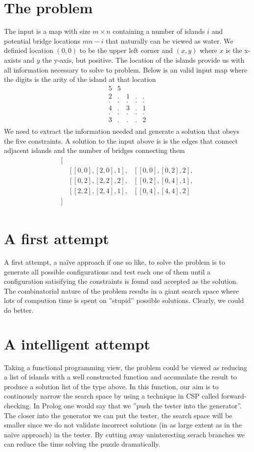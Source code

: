 \documentclass[a4paper,12pt]{article}
\begin{document}
\section*{The problem}
The input is a map with size $m \times n$ containing a number of islands $i$ and potential bridge locations $mn - i$ that naturally can be viewed as water. We definied location $(0,0)$ to be the upper left corner and $(x,y)$ where $x$ is the x-axists and $y$ the y-axis, but positive. The location of the islands provide us with all information necessary to solve to problem. Below is an valid input map where the digits is the arity of the island at that location
\[
	\begin{array}{lllll}
	5 & 5 \\
	2 & . & 1 & . & . \\
	. & . & . & . & . \\
	4 & . & 3 & . & 1 \\
	. & . & . & . & . \\
	3 & . & . & . & 2 \\
	\end{array}
\]
We need to extract the information needed and generate a solution that obeys the five constraints. A solution to the input above is is the edges that connect adjacent islands and the number of bridges connecting them
\[
 \begin{array}{lll}
 	[ \\
 		& [[0,0], [2,0], 1], & [[0,0], [0,2], 2], \\
 		& [[0,2], [2,2], 2], & [[0,2], [0,4], 1], \\
 		& [[2,2], [2,4], 1], & [[0,4], [4,4], 2] \\
 	] \\
 \end{array}
\]
\section*{A first attempt}
A first attempt, a naïve approach if one so like, to solve the problem is to generate all possible configurations and test each one of them until a configuration satisifying the constraints is found and accepted as the solution. The combinatorial nature of the problem results in a giant search space where lots of compution time is spent on ''stupid'' possible solutions. Clearly, we could do better.

\section*{A intelligent attempt}
Taking a functional programming view, the problem could be viewed as reducing a list of islands with a well constructed function and accumulate the result to produce a solution list of the type above. In this function, our aim is to continously narrow the search space by using a technique in CSP called forward-checking. In Prolog one would say that we ''push the tester into the generator''. The closer into the generator we can put the tester, the search space will be smaller since we do not validate incorrect solutions (in as large extent as in the naïve approach) in the tester. By cutting away uninteresting serach branches we can reduce the time solving the puzzle dramatically.
\end{document}
